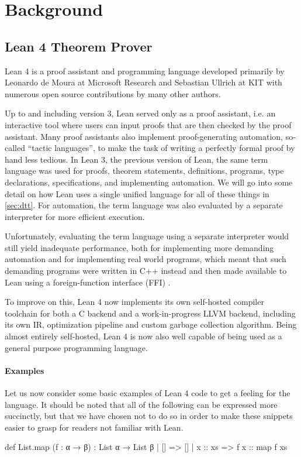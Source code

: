 \chapter{Background}\label{sec:background}

\section{Lean 4 Theorem Prover}\label{sec:lean4}
Lean 4 is a proof assistant and programming language developed primarily by Leonardo de Moura at Microsoft Research and Sebastian Ullrich at KIT with numerous open source contributions by many other authors.

Up to and including version 3, Lean served only as a proof assistant, i.e. an interactive tool where users can input proofs that are then checked by the proof assistant. Many proof assistants also implement proof-generating automation, so-called ``tactic languages'', to make the task of writing a perfectly formal proof by hand less tedious. In Lean 3, the previous version of Lean, the same term language was used for proofs, theorem statements, definitions, programs, type declarations, specifications, and implementing automation. We will go into some detail on how Lean uses a single unified language for all of these things in \cref{sec:dtt}. For automation, the term language was also evaluated by a separate interpreter for more efficient execution.

Unfortunately, evaluating the term language using a separate interpreter would still yield inadequate performance, both for implementing more demanding automation and for implementing real world programs, which meant that such demanding programs were written in C++ instead and then made available to Lean using a foreign-function interface (FFI) \citep{ullrich_counting_2020}.

To improve on this, Lean 4 now implements its own self-hosted compiler toolchain for both a C backend and a work-in-progress LLVM \citep{lattner_llvm_2004} backend, including its own IR, optimization pipeline and custom garbage collection algorithm. Being almost entirely self-hosted, Lean 4 is now also well capable of being used as a general purpose programming language.

\subsubsection{Examples}
Let us now consider some basic examples of Lean 4 code to get a feeling for the language. It should be noted that all of the following can be expressed more succinctly, but that we have chosen not to do so in order to make these snippets easier to grasp for readers not familiar with Lean.\\
\begin{code}
def List.map (f : α → β) : List α → List β
  | []      => []
  | x :: xs => f x :: map f xs
\end{code}

